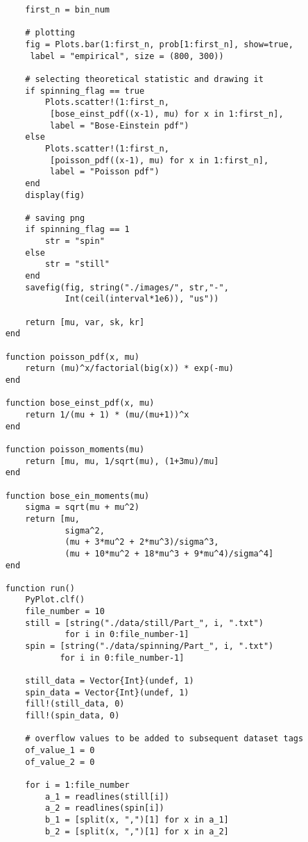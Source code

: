 \documentclass[10pt, a4paper, final]{article}
\begin{document}
\begin{mdframed}
\begin{lstlisting}
        first_n = bin_num
    
        # plotting
        fig = Plots.bar(1:first_n, prob[1:first_n], show=true,
         label = "empirical", size = (800, 300))
        
        # selecting theoretical statistic and drawing it 
        if spinning_flag == true
            Plots.scatter!(1:first_n,
             [bose_einst_pdf((x-1), mu) for x in 1:first_n],
             label = "Bose-Einstein pdf")
        else
            Plots.scatter!(1:first_n,
             [poisson_pdf((x-1), mu) for x in 1:first_n],
             label = "Poisson pdf")
        end
        display(fig)
    
        # saving png
        if spinning_flag == 1
            str = "spin"
        else
            str = "still"
        end
        savefig(fig, string("./images/", str,"-",
                Int(ceil(interval*1e6)), "us"))
        
        return [mu, var, sk, kr]
    end
    
    function poisson_pdf(x, mu)
        return (mu)^x/factorial(big(x)) * exp(-mu)
    end
    
    function bose_einst_pdf(x, mu)
        return 1/(mu + 1) * (mu/(mu+1))^x
    end
    
    function poisson_moments(mu)
        return [mu, mu, 1/sqrt(mu), (1+3mu)/mu]
    end
    
    function bose_ein_moments(mu)
        sigma = sqrt(mu + mu^2)
        return [mu,
                sigma^2,
                (mu + 3*mu^2 + 2*mu^3)/sigma^3,
                (mu + 10*mu^2 + 18*mu^3 + 9*mu^4)/sigma^4]
    end
    
    function run()
        PyPlot.clf()
        file_number = 10
        still = [string("./data/still/Part_", i, ".txt") 
                for i in 0:file_number-1]
        spin = [string("./data/spinning/Part_", i, ".txt") 
               for i in 0:file_number-1]

        still_data = Vector{Int}(undef, 1)
        spin_data = Vector{Int}(undef, 1)
        fill!(still_data, 0)
        fill!(spin_data, 0)
    
        # overflow values to be added to subsequent dataset tags
        of_value_1 = 0
        of_value_2 = 0
    
        for i = 1:file_number
            a_1 = readlines(still[i])
            a_2 = readlines(spin[i])
            b_1 = [split(x, ",")[1] for x in a_1]
            b_2 = [split(x, ",")[1] for x in a_2]
    

\end{lstlisting}
\end{mdframed}
\end{document}
